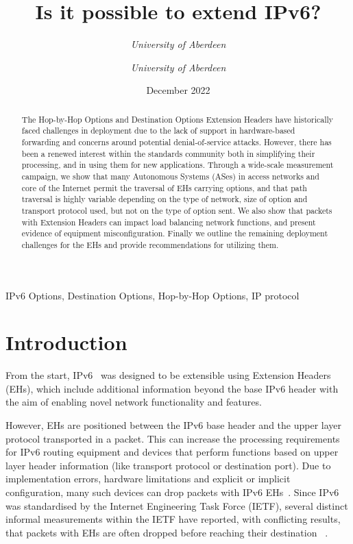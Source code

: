 \documentclass[conference]{IEEEtran}
\title{Is it possible to extend IPv6?}
\date{December 2022}
\author{\IEEEauthorblockN{Ana Custura}
\IEEEauthorblockA{
\textit{University of Aberdeen}\\
}
\and
\IEEEauthorblockN{Raffaello Secchi}
\textit{University of Aberdeen}\\
\and
\IEEEauthorblockN{Gorry Fairhurst}
\textit{University of Aberdeen}\\
}
\begin{document}
\maketitle

\begin{abstract}
The Hop-by-Hop Options and Destination Options Extension Headers have historically faced challenges in deployment due to the lack of support in hardware-based forwarding and concerns around potential denial-of-service attacks. However, there has been a renewed interest within the standards community both in simplifying their processing, and in using them for new applications. 
Through a wide-scale measurement campaign, we show that many Autonomous Systems (ASes) in access networks and core of the Internet permit the traversal of EHs carrying options, and that path traversal is highly variable depending on the type of network, size of option and transport protocol used, but not on the type of option sent. We also show that packets with Extension Headers can impact load balancing network functions, and present evidence of equipment misconfiguration. Finally we outline the remaining deployment challenges for the EHs and provide recommendations for utilizing them.

\end{abstract}

\begin{IEEEkeywords}
IPv6 Options, Destination Options, Hop-by-Hop Options, IP protocol
\end{IEEEkeywords}

\section{Introduction}
\label{sec:introduction}

  
From the start, IPv6~\cite{RFC8200} was designed to be extensible using Extension Headers (EHs), which include additional information beyond the base IPv6 header with the aim of enabling novel network functionality and features.

However, EHs are positioned between the IPv6 base header and the upper layer protocol transported in a packet. This can increase the processing requirements for IPv6 routing equipment and devices that perform functions based on upper layer header information (like transport protocol or destination port). %
Due to implementation errors, hardware limitations and explicit or implicit configuration, many such devices can drop packets with IPv6 EHs~\cite{rfc9098}. Since IPv6 was standardised by the Internet Engineering Task Force (IETF), several distinct informal measurements within the IETF have reported,  with conflicting results, that packets with EHs are often dropped before reaching their destination~\cite{RFC7872} \cite{apnic} \cite{nalini-iepg114} \cite{james}.
\end{document}
